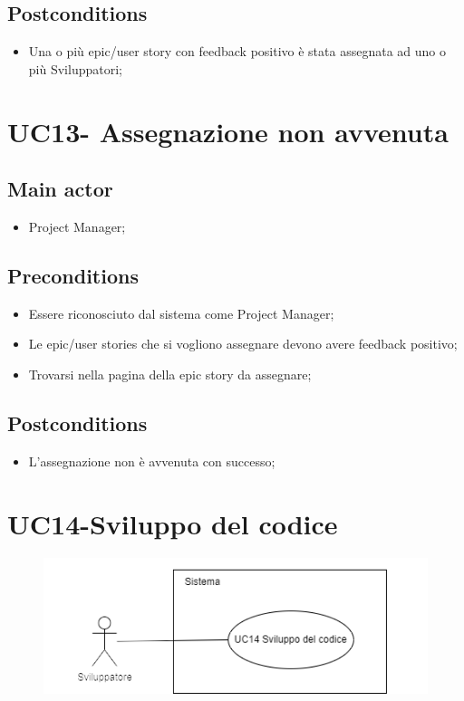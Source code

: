 \documentclass{article}
\begin{document}
    \subsection*{Postconditions}
        \begin{itemize}
            \item Una o più epic/user story con feedback positivo è stata assegnata ad uno o più Sviluppatori;
        \end{itemize}

\section{UC13- Assegnazione non avvenuta}

       \subsection*{Main actor}
    \begin{itemize}
        \item Project Manager;
    \end{itemize}
    
    \subsection*{Preconditions}
        \begin{itemize}
            \item Essere riconosciuto dal sistema come Project Manager;
            \item Le epic/user stories che si vogliono assegnare devono avere feedback positivo;
            \item Trovarsi nella pagina della epic story da assegnare;
        \end{itemize}
        
    \subsection*{Postconditions}
        \begin{itemize}
            \item L'assegnazione non è avvenuta con successo;
        \end{itemize}
    
\section{UC14-Sviluppo del codice}
    \begin{figure}[h]
      \centering
      \includegraphics{./imgUML/UC14.png}
      \label{fig:immagine}
    \end{figure}
    
\end{document}
